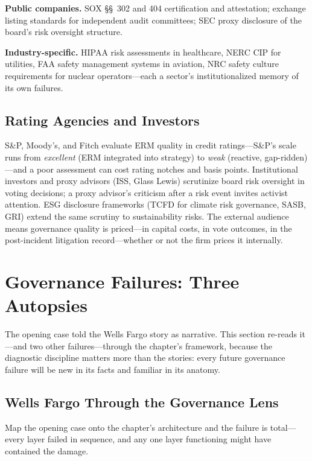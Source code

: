 \documentclass[11pt,openany]{book}
\begin{document}
\textbf{Public companies.} SOX \S\S~302 and 404 certification and
attestation; exchange listing standards for independent audit committees; SEC
proxy disclosure of the board's risk oversight structure.

\textbf{Industry-specific.} HIPAA risk assessments in healthcare, NERC CIP
for utilities, FAA safety management systems in aviation, NRC safety culture
requirements for nuclear operators---each a sector's institutionalized memory
of its own failures.

\subsection{Rating Agencies and Investors}

S\&P, Moody's, and Fitch evaluate ERM quality in credit ratings---S\&P's
scale runs from \emph{excellent} (ERM integrated into strategy) to
\emph{weak} (reactive, gap-ridden)---and a poor assessment can cost rating
notches and basis points. Institutional investors and proxy advisors (ISS,
Glass Lewis) scrutinize board risk oversight in voting decisions; a proxy
advisor's criticism after a risk event invites activist attention. ESG
disclosure frameworks (TCFD for climate risk governance, SASB, GRI) extend
the same scrutiny to sustainability risks. The external audience means
governance quality is priced---in capital costs, in vote outcomes, in the
post-incident litigation record---whether or not the firm prices it
internally.

\section{Governance Failures: Three Autopsies}
\label{sec:failures}

The opening case told the Wells Fargo story as narrative. This section
re-reads it---and two other failures---through the chapter's framework,
because the diagnostic discipline matters more than the stories: every future
governance failure will be new in its facts and familiar in its anatomy.

\subsection{Wells Fargo Through the Governance Lens}
\label{subsec:wf-autopsy}

Map the opening case onto the chapter's architecture and the failure is
total---every layer failed in sequence, and any one layer functioning might
have contained the damage.
\end{document}
